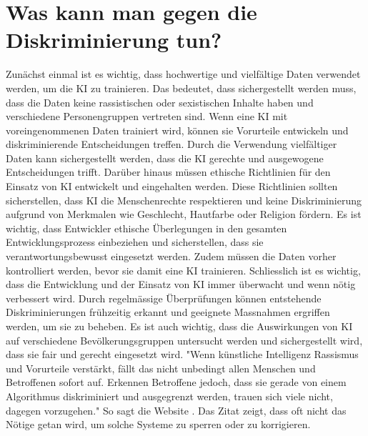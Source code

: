 \documentclass{article}
\begin{document}
\section{Was kann man gegen die Diskriminierung tun?}
Zunächst einmal ist es wichtig, dass hochwertige und vielfältige Daten verwendet werden, um die KI zu trainieren. Das bedeutet, dass sichergestellt werden muss, dass die Daten keine rassistischen oder sexistischen Inhalte haben und verschiedene Personengruppen vertreten sind. Wenn eine KI mit voreingenommenen Daten trainiert wird, können sie Vorurteile entwickeln und diskriminierende Entscheidungen treffen. Durch die Verwendung vielfältiger Daten kann sichergestellt werden, dass die KI gerechte und ausgewogene Entscheidungen trifft. Darüber hinaus müssen ethische Richtlinien für den Einsatz von KI entwickelt und eingehalten werden. Diese Richtlinien sollten sicherstellen, dass KI die Menschenrechte respektieren und keine Diskriminierung aufgrund von Merkmalen wie Geschlecht, Hautfarbe oder Religion fördern. Es ist wichtig, dass Entwickler ethische Überlegungen in den gesamten Entwicklungsprozess einbeziehen und sicherstellen, dass sie verantwortungsbewusst eingesetzt werden. Zudem müssen die Daten vorher kontrolliert werden, bevor sie damit eine KI trainieren. Schliesslich ist es wichtig, dass die Entwicklung und der Einsatz von KI immer überwacht und wenn nötig verbessert wird. Durch regelmässige Überprüfungen können entstehende Diskriminierungen frühzeitig erkannt und geeignete Massnahmen ergriffen werden, um sie zu beheben. Es ist auch wichtig, dass die Auswirkungen von KI auf verschiedene Bevölkerungsgruppen untersucht werden und sichergestellt wird, dass sie fair und gerecht eingesetzt wird. "Wenn künstliche Intelligenz Rassismus und Vorurteile verstärkt, fällt das nicht unbedingt allen Menschen und Betroffenen sofort auf. Erkennen Betroffene jedoch, dass sie gerade von einem Algorithmus diskriminiert und ausgegrenzt werden, trauen sich viele nicht, dagegen vorzugehen." So sagt die Website \citep{KI-Rassismus}. Das Zitat zeigt, dass oft nicht das Nötige getan wird, um solche Systeme zu sperren oder zu korrigieren.
\end{document}
